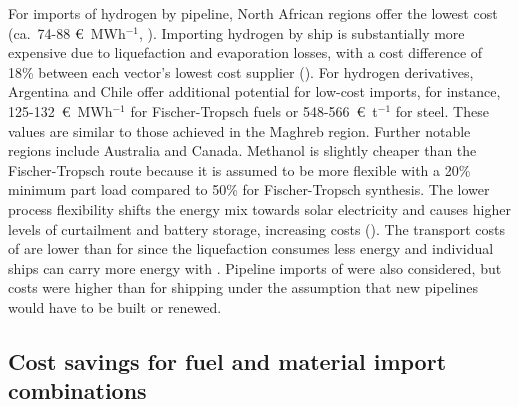 For imports of hydrogen by pipeline, North African regions offer the lowest cost
(ca.~74-88 \euro{}~MWh$^{-1}$, ). Importing hydrogen
by ship is substantially more expensive due to liquefaction and evaporation
losses, with a cost difference of 18\% between each vector's lowest cost
supplier (). For hydrogen derivatives, Argentina and
Chile offer additional potential for low-cost imports, for instance,
125-132~\euro{}~MWh$^{-1}$ for Fischer-Tropsch fuels or 548-566~\euro{}~t$^{-1}$
for steel. These values are similar to those achieved in the Maghreb region.
Further notable regions include Australia and Canada. Methanol is slightly cheaper
than the Fischer-Tropsch route because it is assumed to be more flexible with a
20\% minimum part load compared to 50\% for Fischer-Tropsch
synthesis.\cite{brownUltralongdurationEnergyStorage2023} The lower process
flexibility shifts the energy mix towards solar electricity and causes higher
levels of curtailment and battery storage, increasing costs
(). The transport costs of  are lower
than for  since the liquefaction consumes less energy and individual
ships can carry more energy with . Pipeline imports of 
were also considered, but costs were higher than for  shipping under
the assumption that new pipelines would have to be built or renewed.

\begin{figure}
\end{figure}

\subsection*{Cost savings for fuel and material import combinations}

